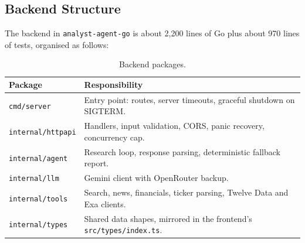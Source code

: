 \documentclass[12pt,a4paper,oneside]{report}
\begin{document}
\subsection{Backend Structure}
The backend in \texttt{analyst-agent-go} is about 2{,}200 lines of Go plus about 970 lines of tests, organised as follows:
\begin{table}[H]\centering\small
\begin{tabularx}{\textwidth}{>{\raggedright\arraybackslash}p{4.2cm}X}
\toprule \textbf{Package} & \textbf{Responsibility}\\\midrule
\texttt{cmd/server} & Entry point: routes, server timeouts, graceful shutdown on SIGTERM.\\
\texttt{internal/httpapi} & Handlers, input validation, CORS, panic recovery, concurrency cap.\\
\texttt{internal/agent} & Research loop, response parsing, deterministic fallback report.\\
\texttt{internal/llm} & Gemini client with OpenRouter backup.\\
\texttt{internal/tools} & Search, news, financials, ticker parsing, Twelve Data and Exa clients.\\
\texttt{internal/types} & Shared data shapes, mirrored in the frontend's \texttt{src/types/index.ts}.\\
\bottomrule
\end{tabularx}
\caption{Backend packages.}
\label{tab:packages}
\end{table}
\end{document}
